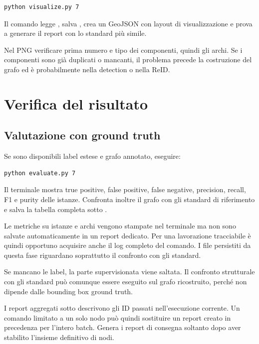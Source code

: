 \begin{lstlisting}[language={}]
python visualize.py 7
\end{lstlisting}

Il comando legge , salva
, crea un GeoJSON con layout di visualizzazione e
prova a generare il report con lo standard più simile.

Nel PNG verificare prima numero e tipo dei componenti, quindi gli archi. Se i
componenti sono già duplicati o mancanti, il problema precede la
costruzione del grafo ed è probabilmente nella detection o nella ReID.

\section{Verifica del risultato}

\subsection{Valutazione con ground truth}

Se sono disponibili label estese e grafo annotato, eseguire:

\begin{lstlisting}[language={}]
python evaluate.py 7
\end{lstlisting}

Il terminale mostra true positive, false positive, false negative, precision,
recall, F1 e purity delle istanze. Confronta inoltre il grafo con gli standard
di riferimento e salva la tabella completa sotto
.

Le metriche su istanze e archi vengono stampate nel terminale ma non sono
salvate automaticamente in un report dedicato. Per una lavorazione tracciabile
è quindi opportuno acquisire anche il log completo del comando. I file persistiti
da questa fase riguardano soprattutto il confronto con gli standard.

Se mancano le label, la parte supervisionata viene saltata. Il confronto
strutturale con gli standard può comunque essere eseguito sul grafo ricostruito,
perché non dipende dalle bounding box ground truth.

I report aggregati sotto  descrivono gli ID
passati nell'esecuzione corrente. Un comando limitato a un solo nodo può quindi
sostituire un report creato in precedenza per l'intero batch. Genera i report di
consegna soltanto dopo aver stabilito l'insieme definitivo di nodi.

